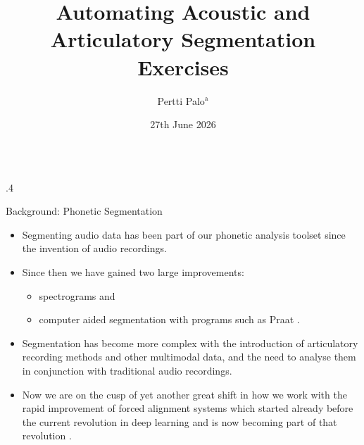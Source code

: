 \documentclass[final,hyperref={pdfpagelabels=false}]{beamer}
\title{\huge Automating Acoustic and Articulatory Segmentation Exercises}
\author{Pertti Palo$^{\mathrm{a}}$}
\institute{University of Alberta, Edmonton, Alberta, Canada}
\date{27th June 2026}
\begin{document}
\begin{frame}{} 
  \vspace{-1cm}
  \begin{columns}[t]
    \begin{column}{.4\linewidth}
      
      \begin{block}{Background: Phonetic Segmentation}
            \begin{itemize}
            \item Segmenting audio data has been part of our phonetic analysis
            toolset since the invention of audio recordings. 
            \item Since then we have gained two large improvements: 
            \begin{itemize}
              \item spectrograms \citep{Gabor-TheoryCommunicationPart-1946,KoenigEtAl-SoundSpectrograph-1946,Fant-SoundSpectrography-1961} and
              \item computer aided segmentation with programs such as Praat
                \citep{BoersmaWeenink-PraatDoingPhonetics-2010}. 
            \end{itemize}
            \item Segmentation has become more complex with the introduction of
              articulatory recording methods and other multimodal data, and the
              need to analyse them in conjunction with traditional audio
              recordings. 
            \item Now we are on the cusp of yet another great shift in how we
              work with the rapid improvement of forced alignment systems which
              started already before the current revolution in deep learning
              \citep[see e.g.][]{RosenfelderEtAl-FAVEForcedAlignment-2022} and is
              now becoming part of that revolution
              \citep{McAuliffeEtAl-MontrealForcedAligner-2017,KelleyEtAl-MasonAlbertaPhoneticSegmenter-2024}.
            \end{itemize}
      \end{block}
      

\end{column}
\end{columns}
\end{frame}
\end{document}
